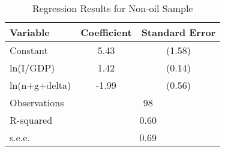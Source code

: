 \begin{table}[ht]
\centering
\caption{Regression Results for Non-oil Sample}
\begin{tabular}{lcc}
\hline
Variable & Coefficient & Standard Error \\
\hline
Constant & 5.43 & (1.58) \\
ln(I/GDP) & 1.42 & (0.14) \\
ln(n+g+delta) & -1.99 & (0.56) \\
\hline
Observations & \multicolumn{2}{c}{98} \\
R-squared & \multicolumn{2}{c}{0.60} \\
s.e.e. & \multicolumn{2}{c}{0.69} \\
\hline
\end{tabular}
\end{table}
